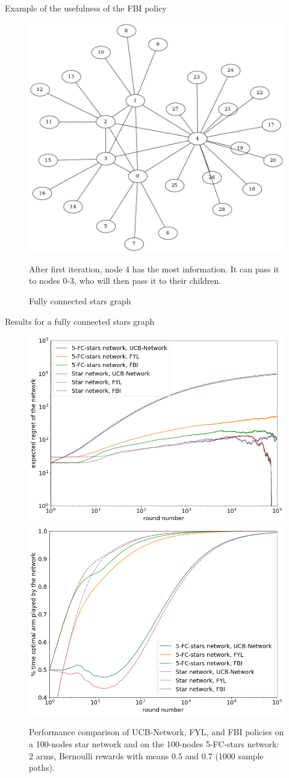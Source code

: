 \documentclass{beamer}
\begin{document}
\begin{frame}{Example of the usefulness of the FBI policy}
\begin{figure}
\includegraphics[scale=0.18]{fcstars}
\caption{\centering Fully connected stars graph}
After first iteration, node 4 has the most information. It can pass it to nodes 0-3, who will then pass it to their children.
\end{figure}
\end{frame}

\begin{frame}{Results for a fully connected stars graph}
\begin{figure}[H]
  \centering
  \includegraphics[width=0.49\linewidth]{fig4_1.png}
  \includegraphics[width=0.49\linewidth]{fig4_2.png}
  \caption{\centering Performance comparison of UCB-Network, FYL, and FBI policies on a 100-nodes star network and on the 100-nodes 5-FC-stars network: 2 arms, Bernoulli rewards with means $0.5$ and $0.7$ (1000 sample paths).}
\end{figure}
\end{frame}
\end{document}
